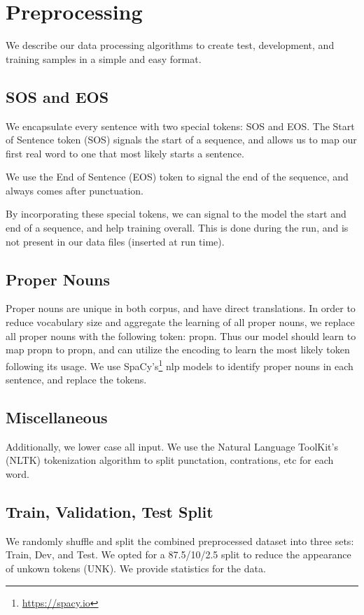\documentclass[twoside,twocolumn]{article}
\begin{document}
\section{Preprocessing}
\label{sec:preprocess}
We describe our data processing algorithms to create test, development,
and training samples in a simple and easy format.
\subsection{SOS and EOS}
We encapsulate every sentence with two special tokens: SOS and EOS.
The Start of Sentence token (SOS) signals the start of a sequence, and allows
us to map our first real word to one that most likely starts a sentence.

We use the End of Sentence (EOS) token to signal the end of the sequence, and
always comes after punctuation.

By incorporating these special tokens, we can signal to the model the start and
end of a sequence, and help training overall. This is done during the run, and
is not present in our data files (inserted at run time).

\subsection{Proper Nouns}
Proper nouns are unique in both corpus, and have direct translations. In order
to reduce vocabulary size and aggregate the learning of all proper nouns,
we replace all proper nouns with the following token: propn. Thus our model
should learn to map propn to propn, and can utilize the encoding to learn the
most likely token following its usage. We use
SpaCy's\footnote{\url{https://spacy.io}} nlp models to identify
proper nouns in each sentence, and replace the tokens.

\subsection{Miscellaneous}
Additionally, we lower case all input. We use the Natural Language ToolKit's
(NLTK) tokenization algorithm
to split punctation, contrations, etc for each word.

\subsection{Train, Validation, Test Split}
We randomly shuffle and split the combined preprocessed dataset into three sets:
Train, Dev, and Test. We opted for a 87.5/10/2.5 split to reduce the appearance
of unkown tokens (UNK). We provide statistics for the data.
\end{document}
